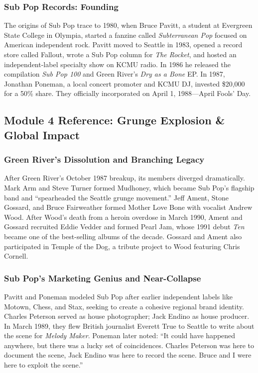 \documentclass[11pt,letterpaper]{article}
\begin{document}
\subsubsection{Sub Pop Records: Founding}

The origins of Sub Pop trace to 1980, when Bruce Pavitt, a student at Evergreen State College in Olympia, started a fanzine called \textit{Subterranean Pop} focused on American independent rock. Pavitt moved to Seattle in 1983, opened a record store called Fallout, wrote a Sub Pop column for \textit{The Rocket}, and hosted an independent-label specialty show on KCMU radio. In 1986 he released the compilation \textit{Sub Pop 100} and Green River's \textit{Dry as a Bone} EP. In 1987, Jonathan Poneman, a local concert promoter and KCMU DJ, invested \$20,000 for a 50\% share. They officially incorporated on April 1, 1988---April Fools' Day.

\subsection{Module 4 Reference: Grunge Explosion \& Global Impact}

\subsubsection{Green River's Dissolution and Branching Legacy}

After Green River's October 1987 breakup, its members diverged dramatically. Mark Arm and Steve Turner formed Mudhoney, which became Sub Pop's flagship band and ``spearheaded the Seattle grunge movement.'' Jeff Ament, Stone Gossard, and Bruce Fairweather formed Mother Love Bone with vocalist Andrew Wood. After Wood's death from a heroin overdose in March 1990, Ament and Gossard recruited Eddie Vedder and formed Pearl Jam, whose 1991 debut \textit{Ten} became one of the best-selling albums of the decade. Gossard and Ament also participated in Temple of the Dog, a tribute project to Wood featuring Chris Cornell.

\subsubsection{Sub Pop's Marketing Genius and Near-Collapse}

Pavitt and Poneman modeled Sub Pop after earlier independent labels like Motown, Chess, and Stax, seeking to create a cohesive regional brand identity. Charles Peterson served as house photographer; Jack Endino as house producer. In March 1989, they flew British journalist Everett True to Seattle to write about the scene for \textit{Melody Maker}. Poneman later noted: ``It could have happened anywhere, but there was a lucky set of coincidences. Charles Peterson was here to document the scene, Jack Endino was here to record the scene. Bruce and I were here to exploit the scene.''
\end{document}
